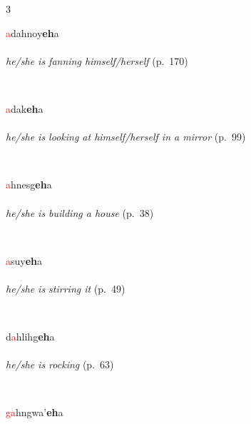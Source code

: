 \documentclass[oneside,openany]{book}%
\begin{document}
\noindent\begin{multicols}{3}%
\begin{minipage}[t]{\linewidth}
\raggedright\noindent \textcolor{Red}{a}dahnoy\textbf{eh}a\\
\\
\noindent \textit{he/she is fanning himself/herself} (p.~170)
\end{minipage}\\[1em]%
\begin{minipage}[t]{\linewidth}
\raggedright\noindent \textcolor{Red}{a}dak\textbf{eh}a\\
\\
\noindent \textit{he/she is looking at himself/herself in a mirror} (p.~99)
\end{minipage}\\[1em]%
\begin{minipage}[t]{\linewidth}
\raggedright\noindent \textcolor{Red}{a}hnesg\textbf{eh}a\\
\\
\noindent \textit{he/she is building a house} (p.~38)
\end{minipage}\\[1em]%
\begin{minipage}[t]{\linewidth}
\raggedright\noindent \textcolor{Red}{a}suy\textbf{eh}a\\
\\
\noindent \textit{he/she is stirring it} (p.~49)
\end{minipage}\\[1em]%
\begin{minipage}[t]{\linewidth}
\raggedright\noindent d\textcolor{Red}{a}hlihg\textbf{eh}a\\
\\
\noindent \textit{he/she is rocking} (p.~63)
\end{minipage}\\[1em]%
\begin{minipage}[t]{\linewidth}
\raggedright\noindent \textcolor{Red}{ga}hngwa'\textbf{eh}a\\
\\

\end{minipage}
\end{multicols}
\end{document}
